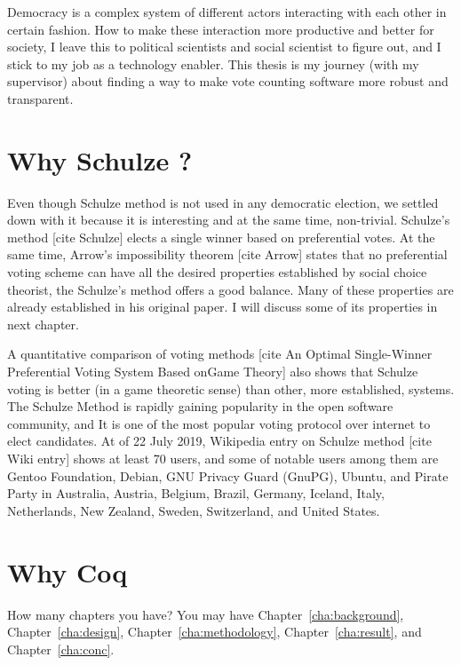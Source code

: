 Democracy is a complex system of different actors interacting with each other in certain fashion.  How to make 
these interaction more productive and better for society, I leave this to political scientists and social scientist
to figure out, and I stick to my job as a technology enabler.  This thesis is  my journey 
(with my supervisor) about finding  a way to make vote counting software more robust and transparent.




\section{Why Schulze ?}
\label{sec:thesisstatement}
Even though Schulze method is not used in any democratic election, we settled down 
with it because it is interesting  and at the same time, non-trivial. 
 Schulze's method [cite Schulze]  elects  a single winner based on 
preferential votes.  At the same time, Arrow's impossibility theorem [cite Arrow]  states that no preferential voting 
scheme can have all the desired properties established by  social choice theorist,
the Schulze's method offers a good balance. Many of these properties are already 
established in his original paper. I will discuss some of its properties in next chapter. 


A  quantitative  comparison of voting methods 
[cite An Optimal Single-Winner Preferential Voting System Based onGame Theory]  also shows that 
Schulze voting is better (in a game theoretic sense) than other, more established, systems.  The 
Schulze Method is rapidly gaining popularity in the open software community, and It is one of the most 
popular voting protocol over internet to elect candidates. At of 22 July 2019, Wikipedia entry on Schulze 
method [cite Wiki entry] shows at least 70 users, and some of 
notable users among them are Gentoo Foundation, Debian, GNU Privacy Guard (GnuPG), Ubuntu, and 
Pirate Party in Australia, Austria, Belgium, Brazil, Germany, Iceland, Italy, 
Netherlands, New Zealand, Sweden, Switzerland, and United States.  






\section{Why Coq}
\label{sec:outline}
How many chapters you have? You may have Chapter~\ref{cha:background},
Chapter~\ref{cha:design}, Chapter~\ref{cha:methodology},
Chapter~\ref{cha:result}, and Chapter~\ref{cha:conc}.
